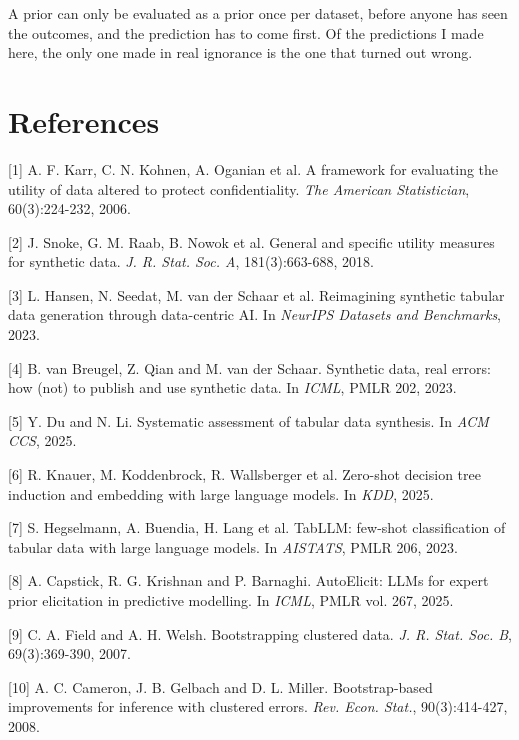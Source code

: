 \documentclass[10pt,a4paper,twocolumn]{article}
\begin{document}
A prior can only be evaluated as a prior once per dataset, before anyone has seen
the outcomes, and the prediction has to come first. Of the predictions I made
here, the only one made in real ignorance is the one that turned out wrong.

\section*{References}
\small

[1] A. F. Karr, C. N. Kohnen, A. Oganian et al. A
framework for evaluating the utility of data altered to protect confidentiality.
\textit{The American Statistician}, 60(3):224-232, 2006.



[2] J. Snoke, G. M. Raab, B. Nowok et al. General and
specific utility measures for synthetic data. \textit{J. R. Stat. Soc. A},
181(3):663-688, 2018.



[3] L. Hansen, N. Seedat, M. van der Schaar et al. Reimagining synthetic tabular
data generation through data-centric AI. In \textit{NeurIPS Datasets and Benchmarks},
2023.



[4] B. van Breugel, Z. Qian and M. van der Schaar. Synthetic data, real errors: how
(not) to publish and use synthetic data. In \textit{ICML}, PMLR 202, 2023.



[5] Y. Du and N. Li. Systematic assessment of tabular data synthesis. In \textit{ACM CCS}, 2025.



[6] R. Knauer, M. Koddenbrock, R. Wallsberger et al. Zero-shot decision tree
induction and embedding with large language models. In \textit{KDD}, 2025.



[7] S. Hegselmann, A. Buendia, H. Lang et al. TabLLM: few-shot classification of
tabular data with large language models. In \textit{AISTATS}, PMLR 206, 2023.



[8] A. Capstick, R. G. Krishnan and P. Barnaghi. AutoElicit: LLMs for expert prior
elicitation in predictive modelling. In \textit{ICML}, PMLR vol. 267, 2025.

[9] C. A. Field and A. H. Welsh. Bootstrapping clustered data. \textit{J. R. Stat. Soc. B}, 69(3):369-390, 2007.



[10] A. C. Cameron, J. B. Gelbach and D. L. Miller. Bootstrap-based improvements for
inference with clustered errors. \textit{Rev. Econ. Stat.}, 90(3):414-427, 2008.
\end{document}

